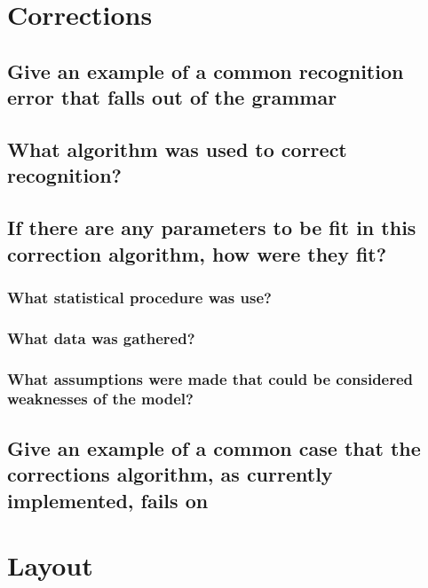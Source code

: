 \documentclass[]{article}
\begin{document}
\section{Corrections}

\subsection{Give an example of a common recognition error that falls out of the grammar}

\subsection{What algorithm was used to correct recognition?}

\subsection{If there are any parameters to be fit in this correction algorithm, how were they fit?}

\subsubsection{What statistical procedure was use?}

\subsubsection{What data was gathered?}

\subsubsection{What assumptions were made that could be considered weaknesses of the model?}

\subsection{Give an example of a common case that the corrections algorithm, as currently implemented, fails on}

\clearpage

\section{Layout}
\end{document}
